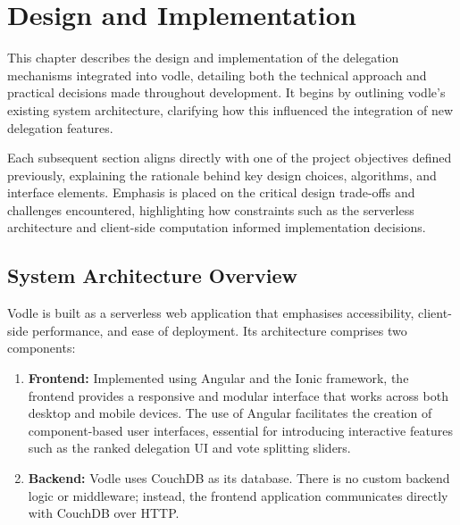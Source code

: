 \chapter{Design and Implementation}
\label{ch:design_implementation}
This chapter describes the design and implementation of the delegation mechanisms integrated into vodle, detailing both the technical approach and practical decisions made throughout development. It begins by outlining vodle's existing system architecture, clarifying how this influenced the integration of new delegation features. 

Each subsequent section aligns directly with one of the project objectives defined previously, explaining the rationale behind key design choices, algorithms, and interface elements. Emphasis is placed on the critical design trade-offs and challenges encountered, highlighting how constraints such as the serverless architecture and client-side computation informed implementation decisions.

\section{System Architecture Overview}\label{sec:design_architecture}
Vodle is built as a serverless web application that emphasises accessibility, client-side performance, and ease of deployment. Its architecture comprises two components:

\begin{enumerate}
  \item \textbf{Frontend:} Implemented using Angular and the Ionic framework, the frontend provides a responsive and modular interface that works across both desktop and mobile devices. The use of Angular facilitates the creation of component-based user interfaces, essential for introducing interactive features such as the ranked delegation UI and vote splitting sliders.
  \item \textbf{Backend:} Vodle uses CouchDB as its database. There is no custom backend logic or middleware; instead, the frontend application communicates directly with CouchDB over HTTP.
\end{enumerate}

